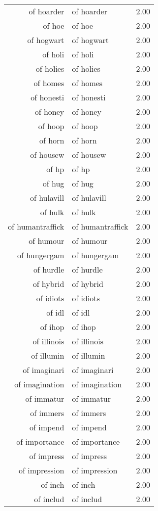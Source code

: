 \begin{table}[ht]
\begin{tabular}{rlr}
  of hoarder & of hoarder & 2.00 \\ 
  of hoe & of hoe & 2.00 \\ 
  of hogwart & of hogwart & 2.00 \\ 
  of holi & of holi & 2.00 \\ 
  of holies & of holies & 2.00 \\ 
  of homes & of homes & 2.00 \\ 
  of honesti & of honesti & 2.00 \\ 
  of honey & of honey & 2.00 \\ 
  of hoop & of hoop & 2.00 \\ 
  of horn & of horn & 2.00 \\ 
  of housew & of housew & 2.00 \\ 
  of hp & of hp & 2.00 \\ 
  of hug & of hug & 2.00 \\ 
  of hulavill & of hulavill & 2.00 \\ 
  of hulk & of hulk & 2.00 \\ 
  of humantraffick & of humantraffick & 2.00 \\ 
  of humour & of humour & 2.00 \\ 
  of hungergam & of hungergam & 2.00 \\ 
  of hurdle & of hurdle & 2.00 \\ 
  of hybrid & of hybrid & 2.00 \\ 
  of idiots & of idiots & 2.00 \\ 
  of idl & of idl & 2.00 \\ 
  of ihop & of ihop & 2.00 \\ 
  of illinois & of illinois & 2.00 \\ 
  of illumin & of illumin & 2.00 \\ 
  of imaginari & of imaginari & 2.00 \\ 
  of imagination & of imagination & 2.00 \\ 
  of immatur & of immatur & 2.00 \\ 
  of immers & of immers & 2.00 \\ 
  of impend & of impend & 2.00 \\ 
  of importance & of importance & 2.00 \\ 
  of impress & of impress & 2.00 \\ 
  of impression & of impression & 2.00 \\ 
  of inch & of inch & 2.00 \\ 
  of includ & of includ & 2.00 \\ 

\end{tabular}
\end{table}
